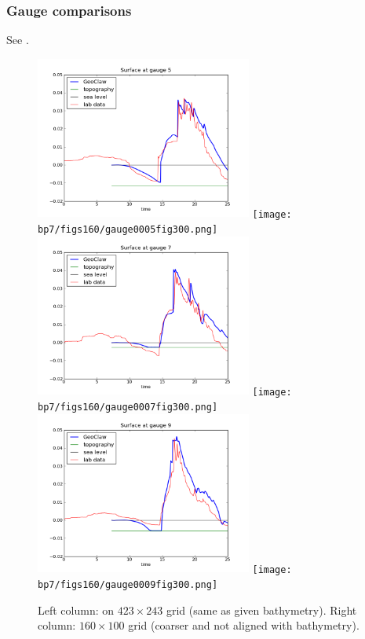 \subsubsection{Gauge comparisons}

See .

\begin{figure}[ht]
\hfil\includegraphics[width=2.8in]{bp7/figs423/gauge0005fig300.png}\hfil
\hfil\texttt{[image: bp7/figs160/gauge0005fig300.png]}\hfil
\vskip 5pt
\hfil\includegraphics[width=2.8in]{bp7/figs423/gauge0007fig300.png}\hfil
\hfil\texttt{[image: bp7/figs160/gauge0007fig300.png]}\hfil
\vskip 5pt
\hfil\includegraphics[width=2.8in]{bp7/figs423/gauge0009fig300.png}\hfil
\hfil\texttt{[image: bp7/figs160/gauge0009fig300.png]}\hfil
\caption{\label{fig:bp7gauges} 
Left column: on $423\times 243$ grid (same as given bathymetry).
Right column: $160\times 100$ grid (coarser and not aligned with
bathymetry).
  }
\end{figure}

